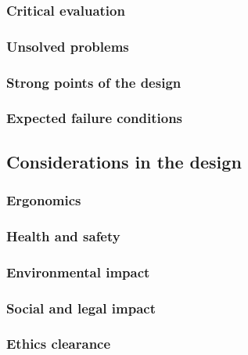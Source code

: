 \subsubsection{Critical evaluation}

\subsubsection{Unsolved problems}

\subsubsection{Strong points of the design}

\subsubsection{Expected failure conditions}

\subsection{Considerations in the design}

\subsubsection{Ergonomics}

\subsubsection{Health and safety}

\subsubsection{Environmental impact}

\subsubsection{Social and legal impact}

\subsubsection{Ethics clearance}

\newpage



